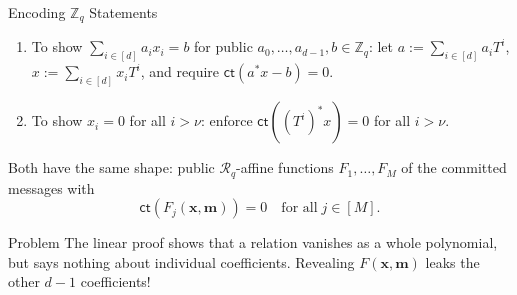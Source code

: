 \documentclass{zkdl-presentation-template}
\begin{document}
    \begin{frame}{Encoding $\mathbb{Z}_q$ Statements}
        \begin{example}
            \begin{enumerate}
                \item To show $\sum_{i \in [d]}a_ix_i = b$ for public $a_0,\dots,a_{d-1},b \in \mathbb{Z}_q$: let $a := \sum_{i \in [d]}a_iT^i$, $x := \sum_{i \in [d]} x_iT^i$, and require $\mathsf{ct}(a^*x-b) = 0$.\pause
                \item To show $x_i=0$ for all $i>\nu$: enforce $\mathsf{ct}((T^i)^*x)=0$ for all $i>\nu$.
            \end{enumerate}
        \end{example}
        \pause

        Both have the same shape: public $\mathcal{R}_q$-affine functions $F_1, \dots, F_M$ of the committed messages with
        \begin{equation*}
            \mathsf{ct}(F_j(\mathbf{x}, \mathbf{m})) = 0 \quad \text{for all} \; j \in [M].
        \end{equation*}
        \pause
        \vspace{-10pt}

        \begin{alertblock}{Problem}
            The linear proof shows that a relation vanishes as a whole polynomial, but says nothing about individual coefficients. Revealing $F(\mathbf{x}, \mathbf{m})$ leaks the other $d-1$ coefficients!
        \end{alertblock}
    \end{frame}
\end{document}
